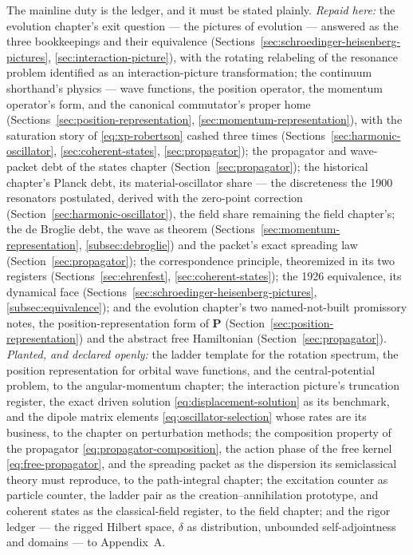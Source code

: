 The mainline duty is the ledger, and it must be stated plainly. \emph{Repaid here:} the evolution chapter's exit question --- the pictures of evolution --- answered as the three bookkeepings and their equivalence (Sections~\ref{sec:schroedinger-heisenberg-pictures}, \ref{sec:interaction-picture}), with the rotating relabeling of the resonance problem identified as an interaction-picture transformation; the continuum shorthand's physics --- wave functions, the position operator, the momentum operator's form, and the canonical commutator's proper home (Sections~\ref{sec:position-representation}, \ref{sec:momentum-representation}), with the saturation story of \eqref{eq:xp-robertson} cashed three times (Sections~\ref{sec:harmonic-oscillator}, \ref{sec:coherent-states}, \ref{sec:propagator}); the propagator and wave-packet debt of the states chapter (Section~\ref{sec:propagator}); the historical chapter's Planck debt, its material-oscillator share --- the discreteness the 1900 resonators postulated, derived with the zero-point correction (Section~\ref{sec:harmonic-oscillator}), the field share remaining the field chapter's; the de Broglie debt, the wave as theorem (Sections~\ref{sec:momentum-representation}, \ref{subsec:debroglie}) and the packet's exact spreading law (Section~\ref{sec:propagator}); the correspondence principle, theoremized in its two registers (Sections~\ref{sec:ehrenfest}, \ref{sec:coherent-states}); the 1926 equivalence, its dynamical face (Sections~\ref{sec:schroedinger-heisenberg-pictures}, \ref{subsec:equivalence}); and the evolution chapter's two named-not-built promissory notes, the position-representation form of $\bm P$ (Section~\ref{sec:position-representation}) and the abstract free Hamiltonian (Section~\ref{sec:propagator}). \emph{Planted, and declared openly:} the ladder template for the rotation spectrum, the position representation for orbital wave functions, and the central-potential problem, to the angular-momentum chapter; the interaction picture's truncation register, the exact driven solution \eqref{eq:displacement-solution} as its benchmark, and the dipole matrix elements \eqref{eq:oscillator-selection} whose rates are its business, to the chapter on perturbation methods; the composition property of the propagator \eqref{eq:propagator-composition}, the action phase of the free kernel \eqref{eq:free-propagator}, and the spreading packet as the dispersion its semiclassical theory must reproduce, to the path-integral chapter; the excitation counter as particle counter, the ladder pair as the creation--annihilation prototype, and coherent states as the classical-field register, to the field chapter; and the rigor ledger --- the rigged Hilbert space, $\delta$ as distribution, unbounded self-adjointness and domains --- to Appendix~A.

